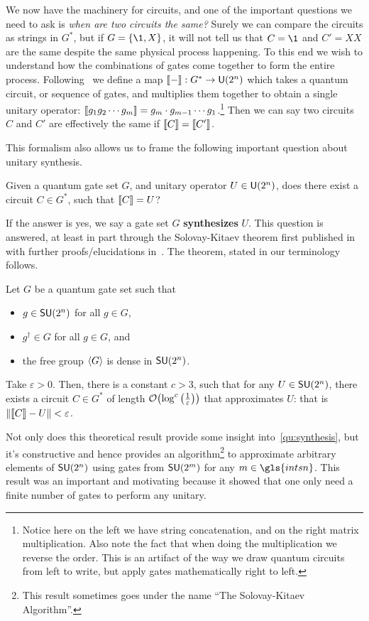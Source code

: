 We now have the machinery for circuits, and one of the important questions we need to ask is \emph{when are two circuits the same?}
Surely we can compare the circuits as strings in $G^*$, but if $G = \qty{\1, X}$, it will not tell us that $C = \1$ and $C' = XX$ are the same despite the same physical process happening.
To this end we wish to understand how the combinations of gates come together to form the entire process.
Following~\cite{formalcircuit} we define a map $\llbracket-\rrbracket: G^* \to \mathsf{U} (2^n)$ which takes a quantum circuit, or sequence of gates, and multiplies them together to obtain a single unitary operator: $\llbracket g_1g_2\cdots g_m\rrbracket = g_m\cdot g_{m-1} \cdots g_1$.\footnote{Notice here on the left we have string concatenation, and on the right matrix multiplication. Also note the fact that when doing the multiplication we reverse the order. This is an artifact of the way we draw quantum circuits from left to write, but apply gates mathematically right to left.}
Then we can say two circuits $C$ and $C'$ are effectively the same if $\llbracket C\rrbracket = \llbracket C'\rrbracket$.

This formalism also allows us to frame the following important question about unitary synthesis.
\begin{question}\label{qu:synthesis}
    Given a quantum gate set $G$, and unitary operator $U\in\mathsf{U} (2^n)$, does there exist a circuit $C\in G^*$, such that $\llbracket C\rrbracket = U$?
\end{question}
If the answer is yes, we say a gate set $G$ \textbf{synthesizes} $U$.
This question is answered, at least in part through the Solovay-Kitaev theorem first published in~\cite{bigkitaev} with further proofs/elucidations in~\cite{nielsenchuang,solovay-kitaev,kitaev-book}.
The theorem, stated in our terminology follows.
\begin{theorem}\label{thm:solovaykitaev}
    Let $G$ be a quantum gate set such that
    \begin{itemize}
        \item $g\in\mathsf{SU} (2^n)$ for all $g\in G$,
        \item $g^\dagger \in G$ for all $g\in G$, and
        \item the free group $\expval{G}$ is dense in $\mathsf{SU} (2^n)$.
    \end{itemize}
    Take $\varepsilon > 0$.
    Then, there is a constant $c > 3$, such that for any $U\in\mathsf{SU} (2^n)$, there exists a circuit $C\in G^*$ of length $\order{\log^c\qty(\frac{1}{\varepsilon})}$ that approximates $U$: that is $\norm{\llbracket C\rrbracket - U} < \varepsilon$. %
\end{theorem}
Not only does this theoretical result provide some insight into~\ref{qu:synthesis}, but it's constructive and hence provides an algorithm\footnote{This result sometimes goes under the name ``The Solovay-Kitaev Algorithm''.} to approximate arbitrary elements of $\mathsf{SU} (2^n)$ using gates from $\mathsf{SU} (2^m)$ for any $m \in \gls{intsn}$.
This result was an important and motivating because it showed that one only need a finite number of gates to perform any unitary.

